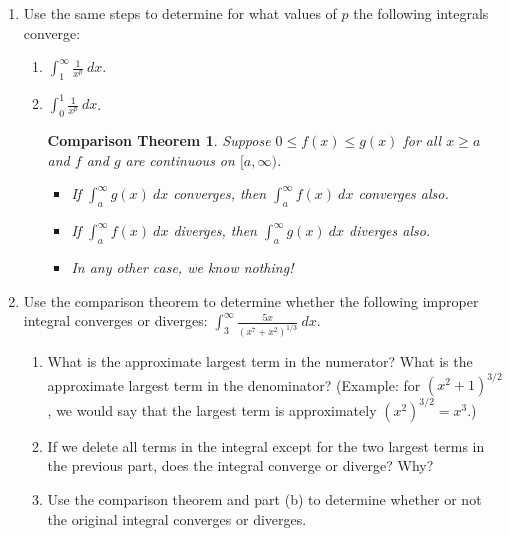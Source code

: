 \documentclass[12pt]{article}
\newtheorem*{comptheorem}{Comparison Theorem}
\begin{document}
\begin{enumerate}
\begin{enumerate}
\item State your conclusion: Does the integral converge or diverge? If it converges, what does it converge to? (That is, what is the finite area enclosed by your infinite fence?)

\bigskip

\bigskip

\bigskip

\bigskip



\end{enumerate}

\newpage

\item Use the same steps to determine for what values of $p$ the following integrals converge:
\begin{enumerate}
\item $\displaystyle\int_1^{\infty} \displaystyle\frac{1}{x^p} \ dx$.
\vfill
\item $\displaystyle\int_0^{1} \displaystyle\frac{1}{x^p} \ dx$.
\vfill

\pagebreak
\begin{comptheorem}
Suppose $0\leq f(x) \leq g(x)$ for all $x\geq a$ and $f$ and $g$ are continuous on $[a,\infty)$.
\begin{itemize}
\item
If $\int_a^{\infty} g(x) \ dx$  converges, then $\int_a^{\infty} f(x) \ dx$  converges also.
\item 
If $\int_a^{\infty} f(x) \ dx$ diverges, then $\int_a^{\infty} g(x) \ dx$  diverges also.
	\item
In any other case, we know nothing!
\end{itemize}
\end{comptheorem}
\end{enumerate}


\item Use the comparison theorem to determine whether the following improper integral converges or diverges: $\displaystyle\int_3^{\infty} \frac{5x}{(x^7+x^2)^{1/3}} \ dx$. 

\begin{enumerate}
\item What is the approximate largest term in the numerator?  What is the approximate largest term in the denominator?  (Example: for $(x^2 + 1)^{3/2}$, we would say that the largest term is approximately $(x^2)^{3/2} = x^3$.)
\vfill
\item If we delete all terms in the integral except for the two largest terms in the previous part, does the integral converge or diverge?  Why?
\vfill
\item Use the comparison theorem and part (b) to determine whether or not the original integral converges or diverges.
\vfill
\vfill
\end{enumerate}


\end{enumerate}
\end{document}

